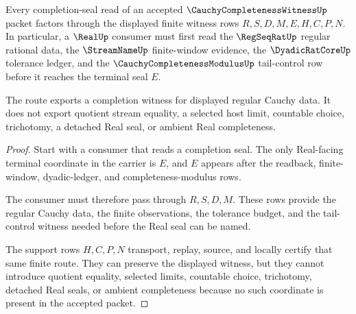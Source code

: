 \begin{theorem}
\label{thm:cauchy-completeness-witness-real-seal-route}
Every completion-seal read of an accepted $\CauchyCompletenessWitnessUp$ packet factors through the displayed finite witness rows $R,S,D,M,E,H,C,P,N$. In particular, a $\RealUp$ consumer must first read the $\RegSeqRatUp$ regular rational data, the $\StreamNameUp$ finite-window evidence, the $\DyadicRatCoreUp$ tolerance ledger, and the $\CauchyCompletenessModulusUp$ tail-control row before it reaches the terminal seal $E$.

The route exports a completion witness for displayed regular Cauchy data. It does not export quotient stream equality, a selected host limit, countable choice, trichotomy, a detached Real seal, or ambient Real completeness.
\end{theorem}
\begin{proof}
Start with a consumer that reads a completion seal. The only Real-facing terminal coordinate in the carrier is $E$, and $E$ appears after the readback, finite-window, dyadic-ledger, and completeness-modulus rows.

The consumer must therefore pass through $R,S,D,M$. These rows provide the regular Cauchy data, the finite observations, the tolerance budget, and the tail-control witness needed before the Real seal can be named.

The support rows $H,C,P,N$ transport, replay, source, and locally certify that same finite route. They can preserve the displayed witness, but they cannot introduce quotient equality, selected limits, countable choice, trichotomy, detached Real seals, or ambient completeness because no such coordinate is present in the accepted packet.
\end{proof}

